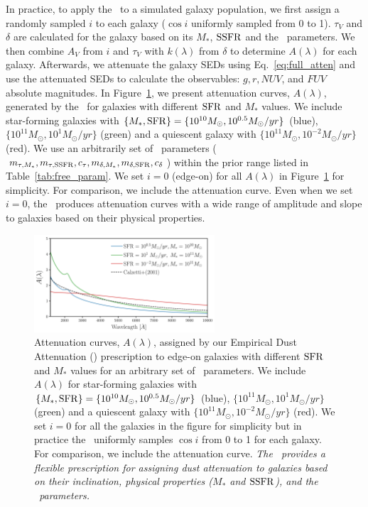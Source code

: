 In practice, to apply the \eda~to a simulated galaxy population, we first
assign a randomly sampled $i$ to each galaxy ($\cos i$ uniformly sampled from 0 to 1).
$\tau_V$ and $\delta$ are calculated for
the galaxy based on its $M_*$,
${\rm SSFR}$ and the \eda~parameters. We then combine $A_V$ from $i$ and
$\tau_V$ with $k(\lambda)$ from $\delta$ to determine $A(\lambda)$ for each
galaxy.
Afterwards, we attenuate the galaxy SEDs using Eq.~\ref{eq:full_atten} and use
the attenuated SEDs to calculate the observables: $g, r, NUV$, and $FUV$
absolute magnitudes. 
In Figure~\ref{fig:dem_av}, we present attenuation curves, $A(\lambda)$,
generated by the \eda~for galaxies with different ${\rm SFR}$ and $M_*$ values.  
We include star-forming galaxies with $\{M_*, {\rm SFR}\} = \{10^{10}M_\odot,
10^{0.5}M_\odot/yr\}$ (blue), $\{10^{11}M_\odot, 10^{1} M_\odot/yr\}$
(green) and a quiescent galaxy with $\{10^{11}M_\odot, 10^{-2}M_\odot/yr\}$
(red).
We use an arbitrarily set of \eda~parameters ($m_{\tau,M_*}, m_{\tau,{\rm SSFR}}, c_\tau,
m_{\delta,M_*}, m_{\delta,{\rm SFR}}, c_\delta$) within the prior range listed in
Table~\ref{tab:free_param}. 
We set $i=0$ (edge-on) for all $A(\lambda)$ in Figure~\ref{fig:dem_av} for
simplicity.
For comparison, we include the \cite{calzetti2001} attenuation curve. Even when
we set $i=0$, the \eda~produces attenuation curves with a wide range
of amplitude and slope to galaxies based on their physical properties. 

\begin{figure}
\begin{center}
    \includegraphics[width=0.6\textwidth]{figs/dems.pdf}
    \caption{\label{fig:dem_av}
    Attenuation curves, $A(\lambda)$, assigned by our Empirical Dust
    Attenuation (\eda) prescription to edge-on galaxies with different ${\rm SFR}$ and
    $M_*$ values for an arbitrary set of \eda~parameters. We include
    $A(\lambda)$ for star-forming galaxies with $\{M_*, {\rm SFR}\} =
    \{10^{10}M_\odot, 10^{0.5}M_\odot/yr\}$ (blue), $\{10^{11}M_\odot, 10^{1}
    M_\odot/yr\}$ (green) and a quiescent galaxy with $\{10^{11}M_\odot,
    10^{-2}M_\odot/yr\}$ (red). We set $i=0$ for
    all the galaxies in the figure for simplicity but in practice the
    \eda~uniformly samples $\cos i$ from 0 to 1 for each galaxy.
    For comparison, we include the \cite{calzetti2001} attenuation curve.
    {\em The \eda~provides a flexible prescription for assigning dust
    attenuation to galaxies based on their inclination, physical properties
    ($M_*$ and ${\rm SSFR}$), and the \eda~parameters.}
    } 
\end{center}
\end{figure}


